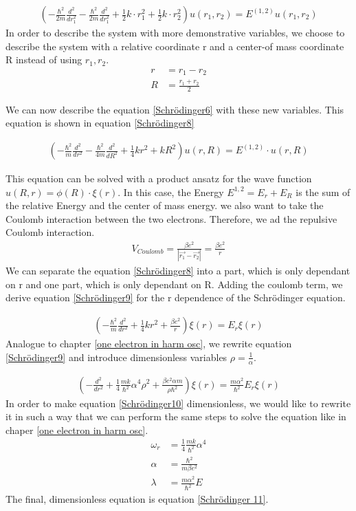 \documentclass[10pt,a4paper]{article}
\begin{document}
\begin{align}
\left(-\frac{\hbar^2}{2 m}  \frac{d^2}{dr_1^2} -\frac{\hbar^2}{2 m}  \frac{d^2}{dr_1^2} + \frac{1}{2}k \cdot r_1^2+ \frac{1}{2}k \cdot r_2^2 \right) u(r_1,r_2)= E^{(1,2)} u(r_1,r_2) \label{Schrödinger7}
\end{align}
In order to describe the system with more demonstrative variables, we choose to describe the system with a relative coordinate r and a center-of mass coordinate R instead of using $r_1,r_2$. 
\begin{align}
r &=r_1-r_2 \\
R &= \frac{r_1+r_2}{2}
\end{align}

We can now describe the equation \ref{Schrödinger6} with these new variables. This equation is shown in equation \ref{Schrödinger8}

\begin{align}
\left(-\frac{\hbar^2}{m} \frac{d^2}{dr^2}- \frac{\hbar^2}{4m} \frac{d^2}{dR^2}+\frac{1}{4}k r^2 + k R^2 \right) u (r,R) = E^{(1,2)} \cdot u(r,R) \label{Schrödinger8}
\end{align}

This equation can be solved with a product ansatz for the wave function $u(R,r)= \phi(R) \cdot \xi(r)$. In this case, the Energy $E^{1,2}=E_r+E_R$ is the sum of the relative Energy and the center of mass energy. 
we also want to take the Coulomb interaction between the two electrons. Therefore, we ad the repulsive Coulomb interaction. 
\begin{align}
V_{Coulomb}= \frac{\beta e^2 }{|\vec{r_1}-\vec{r_2}|}= \frac{\beta e^2}{r}
\end{align}
We can separate the equation \ref{Schrödinger8} into a part, which is only dependant on r and one part, which is only dependant on R.  Adding the coulomb term, we derive equation \ref{Schrödinger9} for the r dependence of the Schrödinger equation. 

\begin{align}
\left( - \frac{\hbar^2}{m} \frac{d^2}{dr^2}+ \frac{1}{4} k r^2 + \frac{\beta e^2}{r} \right) \xi(r)= E_r \xi(r) \label{Schrödinger9}
\end{align}
Analogue to chapter \ref{one electron in harm osc}, we rewrite equation \ref{Schrödinger9} and introduce dimensionless variables $\rho=\frac{1}{\alpha}$. 

\begin{align}
\left(-\frac{d^2}{dr^2}+\frac{1}{4}\frac{mk}{\hbar^2} \alpha^4 \rho^2 + \frac{\beta e^2 \alpha m }{\rho \hbar^2} \right) \xi(r) = \frac{m \alpha^2}{\hbar^2} E_r \xi(r) \label{Schrödinger10}
\end{align}
In order to make equation \ref{Schrödinger10} dimensionless, we would like to rewrite it in such a way that we can perform the same steps to solve the equation like in chaper \ref{one electron in harm osc}. 
\begin{align}
\omega_r &= \frac{1}{4} \frac{mk}{\hbar^2} \alpha^4 \\
\alpha &=  \frac{\hbar^2}{m \beta e^2} \\
\lambda &= \frac{m \alpha^2}{\hbar^2} E
\end{align}
The final, dimensionless equation is equation \ref{Schrödinger 11}. 
\end{document}
